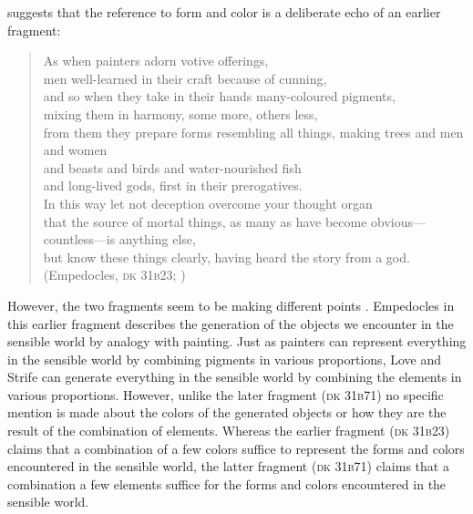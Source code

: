 \citet[222]{Wright:1981zr} suggests that the reference to form and color is a deliberate echo of an earlier fragment:
\begin{verse}
    As when painters adorn votive offerings,\\
    men well-learned in their craft because of cunning,\\
    and so when they take in their hands many-coloured pigments,\\
    mixing them in harmony, some more, others less,\\
    from them they prepare forms resembling all things,
    making trees and men and women\\
    and beasts and birds and water-nourished fish\\
    and long-lived gods, first in their prerogatives.\\
    In this way let not deception overcome your thought organ\\
    that the source of mortal things, as many as have become obvious---count\-less---is anything else,\\
    but know these things clearly, having heard the story from a god.\\ 
    (Empedocles, \textsc{dk} 31\textsc{b}23; \citealt[27 231]{Inwood:2001ve})
\end{verse}
However, the two fragments seem to be making different points \citep[see][4--5]{Ierodiakonou:2005fk}. Empedocles in this earlier fragment describes the generation of the objects we encounter in the sensible world by analogy with painting. Just as painters can represent everything in the sensible world by combining pigments in various proportions, Love and Strife can generate everything in the sensible world by combining the elements in various proportions. However, unlike the later fragment (\textsc{dk} 31\textsc{b}71) no specific mention is made about the colors of the generated objects or how they are the result of the combination of elements. Whereas the earlier fragment (\textsc{dk} 31\textsc{b}23) claims that a combination of a few colors suffice to represent the forms and colors encountered in the sensible world, the latter fragment (\textsc{dk} 31\textsc{b}71) claims that a combination a few elements suffice for the forms and colors encountered in the sensible world.


